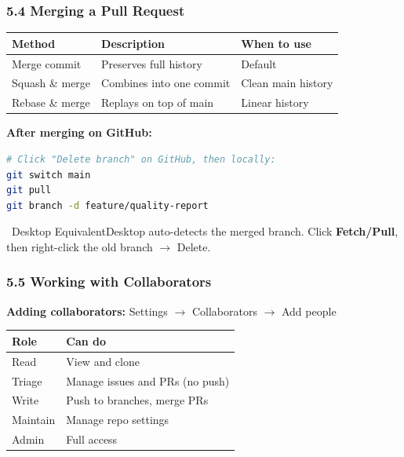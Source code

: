 \documentclass{beamer}
\newcommand{\desktoptip}[1]{\begin{block}{\faMousePointer\ Desktop Equivalent}#1\end{block}}
\begin{document}
\begin{frame}[fragile]
\frametitle{5.4 Merging a Pull Request}

\begin{table}[h]
\centering
\scriptsize
\begin{tabular}{lll}
\toprule
\textbf{Method} & \textbf{Description} & \textbf{When to use} \\
\midrule
Merge commit & Preserves full history & Default \\
Squash \& merge & Combines into one commit & Clean main history \\
Rebase \& merge & Replays on top of main & Linear history \\
\bottomrule
\end{tabular}
\end{table}

\vspace{2mm}
\textbf{After merging on GitHub:}
\begin{lstlisting}[language=bash]
# Click "Delete branch" on GitHub, then locally:
git switch main
git pull
git branch -d feature/quality-report
\end{lstlisting}

\desktoptip{Desktop auto-detects the merged branch. Click \textbf{Fetch/Pull}, then right-click the old branch $\rightarrow$ Delete.}
\end{frame}

\begin{frame}
\frametitle{5.5 Working with Collaborators}

\textbf{Adding collaborators:} Settings $\rightarrow$ Collaborators $\rightarrow$ Add people

\vspace{4mm}
\begin{table}[h]
\centering
\small
\begin{tabular}{ll}
\toprule
\textbf{Role} & \textbf{Can do} \\
\midrule
Read & View and clone \\
Triage & Manage issues and PRs (no push) \\
Write & Push to branches, merge PRs \\
Maintain & Manage repo settings \\
Admin & Full access \\
\bottomrule
\end{tabular}
\end{table}
\end{frame}
\end{document}
